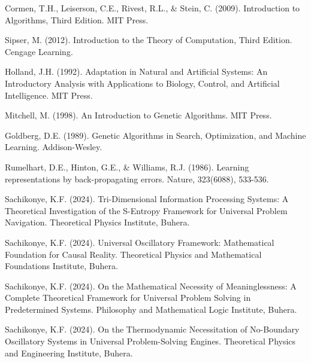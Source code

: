 \documentclass[11pt,a4paper]{article}
\theoremstyle{remark}
\begin{document}

\begin{thebibliography}{99}

Cormen, T.H., Leiserson, C.E., Rivest, R.L., \& Stein, C. (2009). Introduction to Algorithms, Third Edition. MIT Press.

Sipser, M. (2012). Introduction to the Theory of Computation, Third Edition. Cengage Learning.

Holland, J.H. (1992). Adaptation in Natural and Artificial Systems: An Introductory Analysis with Applications to Biology, Control, and Artificial Intelligence. MIT Press.

Mitchell, M. (1998). An Introduction to Genetic Algorithms. MIT Press.

Goldberg, D.E. (1989). Genetic Algorithms in Search, Optimization, and Machine Learning. Addison-Wesley.

Rumelhart, D.E., Hinton, G.E., \& Williams, R.J. (1986). Learning representations by back-propagating errors. Nature, 323(6088), 533-536.

Sachikonye, K.F. (2024). Tri-Dimensional Information Processing Systems: A Theoretical Investigation of the S-Entropy Framework for Universal Problem Navigation. Theoretical Physics Institute, Buhera.

Sachikonye, K.F. (2024). Universal Oscillatory Framework: Mathematical Foundation for Causal Reality. Theoretical Physics and Mathematical Foundations Institute, Buhera.

Sachikonye, K.F. (2024). On the Mathematical Necessity of Meaninglessness: A Complete Theoretical Framework for Universal Problem Solving in Predetermined Systems. Philosophy and Mathematical Logic Institute, Buhera.

Sachikonye, K.F. (2024). On the Thermodynamic Necessitation of No-Boundary Oscillatory Systems in Universal Problem-Solving Engines. Theoretical Physics and Engineering Institute, Buhera.

\end{thebibliography}
\end{document}
